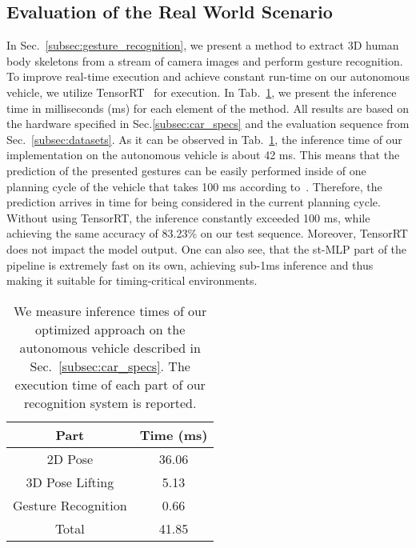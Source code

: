 \documentclass[letterpaper, 10 pt, conference]{ieeeconf}
\begin{document}
\subsection{Evaluation of the Real World Scenario}
\label{subsec:inference}

In Sec.~\ref{subsec:gesture_recognition}, we present a method to extract 3D human body skeletons from a stream of camera images and perform gesture recognition. To improve real-time execution and achieve constant run-time on our autonomous vehicle, we utilize TensorRT~\cite{tensorrt} for execution. In Tab.~\ref{tab:inference_time}, we present the inference time in milliseconds (ms) for each element of the method. All results are based on the hardware specified in Sec.\ref{subsec:car_specs} and the evaluation sequence from Sec.~\ref{subsec:datasets}. As it can be observed in Tab.~\ref{tab:inference_time}, the inference time of our implementation on the autonomous vehicle is about 42 ms. This means that the prediction of the presented gestures can be easily performed inside of one planning cycle of the vehicle that takes 100 ms according to~\cite{BROGGI2012161}. Therefore, the prediction arrives in time for being considered in the current planning cycle. Without using TensorRT, the inference constantly exceeded 100 ms, while achieving the same accuracy of 83.23\% on our test sequence. Moreover, TensorRT does not impact the model output. One can also see, that the st-MLP part of the pipeline is extremely fast on its own, achieving sub-1ms inference and thus making it suitable for timing-critical environments.

\begin{table}
\renewcommand{\arraystretch}{1.1}
\vspace{2mm}
\centering
\caption{We measure inference times of our optimized approach on the autonomous vehicle described in Sec.~\ref{subsec:car_specs}. The execution time of each part of our recognition system is reported.}
\label{tab:inference_time}
    \begin{tabular}{c|c}
    \toprule
    \textbf{Part} & \textbf{Time (ms)} \\
    \midrule
    2D Pose & 36.06 \\
    3D Pose Lifting & 5.13 \\
    Gesture Recognition & 0.66 \\
    \midrule
    Total & 41.85 \\
    \bottomrule
    \end{tabular}
\end{table}
\end{document}
